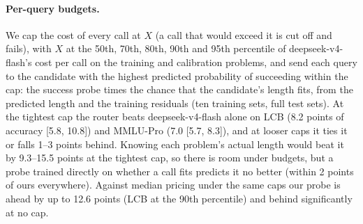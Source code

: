 \documentclass[10pt]{article}
\begin{document}
\paragraph{Per-query budgets.}
We cap the cost of every call at $X$ (a call that would exceed it is cut off and fails), with $X$ at the 50th, 70th, 80th, 90th and 95th percentile of deepseek-v4-flash's cost per call on the training and calibration problems, and send each query to the candidate with the highest predicted probability of succeeding within the cap: the success probe times the chance that the candidate's length fits, from the predicted length and the training residuals (ten training sets, full test sets). At the tightest cap the router beats deepseek-v4-flash alone on LCB (8.2 points of accuracy [5.8, 10.8]) and MMLU-Pro (7.0 [5.7, 8.3]), and at looser caps it ties it or falls 1--3 points behind. Knowing each problem's actual length would beat it by 9.3--15.5 points at the tightest cap, so there is room under budgets, but a probe trained directly on whether a call fits predicts it no better (within 2 points of ours everywhere). Against median pricing under the same caps our probe is ahead by up to 12.6 points (LCB at the 90th percentile) and behind significantly at no cap.
\end{document}
